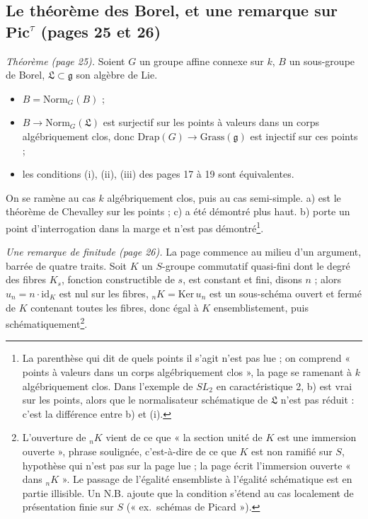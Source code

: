 \documentclass[11pt,a4paper]{article}
\begin{document}
\subsection*{Le théorème des Borel, et une remarque sur $\mathbf{Pic}^{\tau}$ (pages 25 et 26)}

\emph{Théorème (page 25).} Soient $G$ un groupe affine connexe sur $k$, $B$ un
sous-groupe de Borel, $\mathfrak{L} \subset \mathfrak{g}$ son algèbre de Lie.
\begin{itemize}
\item[a)] $B = \mathrm{Norm}_G(B)$ ;
\item[b)] $B \to \mathrm{Norm}_G(\mathfrak{L})$ est surjectif sur les points à
valeurs dans un corps algébriquement clos, donc
$\mathrm{Drap}(G) \to \mathrm{Grass}(\mathfrak{g})$ est injectif sur ces points ;
\item[c)] les conditions (i), (ii), (iii) des pages 17 à 19 sont équivalentes.
\end{itemize}
On se ramène au cas $k$ algébriquement clos, puis au cas semi-simple. a) est le
théorème de Chevalley sur les points ; c) a été démontré plus haut. b) porte un
point d'interrogation dans la marge et n'est pas démontré\footnote{La parenthèse
qui dit de quels points il s'agit n'est pas lue ; on comprend « points à valeurs
dans un corps algébriquement clos », la page se ramenant à $k$ algébriquement
clos. Dans
l'exemple de $SL_2$ en caractéristique 2, b) est vrai sur les points, alors que
le normalisateur schématique de $\mathfrak{L}$ n'est pas réduit : c'est la
différence entre b) et (i).}.

\emph{Une remarque de finitude (page 26).} La page commence au milieu d'un
argument, barrée de quatre traits. Soit $K$ un $S$-groupe commutatif
quasi-fini dont le degré des fibres $K_s$, fonction constructible de $s$, est
constant et fini, disons $n$ ; alors $u_n = n \cdot \mathrm{id}_K$ est nul sur
les fibres, ${}_nK = \mathrm{Ker}\,u_n$ est un sous-schéma ouvert et fermé de $K$
contenant toutes les fibres, donc égal à $K$ ensemblistement, puis
schématiquement\footnote{L'ouverture de ${}_nK$ vient de ce que « la section
unité de $K$ est une immersion ouverte », phrase soulignée, c'est-à-dire de ce
que $K$ est non ramifié sur $S$, hypothèse qui n'est pas sur la page lue ; la
page écrit l'immersion ouverte « dans ${}_nK$ ». Le passage de l'égalité
ensembliste à l'égalité schématique est en partie illisible. Un N.B. ajoute que
la condition s'étend au cas localement de présentation finie sur $S$
(« ex.\ schémas de Picard »).}.
\end{document}
